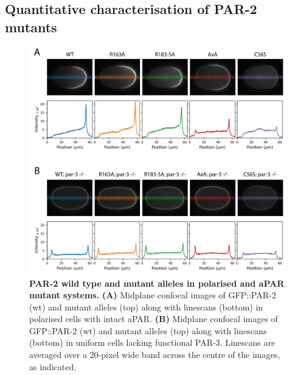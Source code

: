 \documentclass[12pt]{"article"}
\newcommand{\mycaption}[2]{\caption[#1]{\textbf{#1.} #2}}
\begin{document}
\clearpage
\subsection{Quantitative characterisation of PAR-2 mutants}

\begin{figure}
\includegraphics[scale=0.95]{par2_misc_mutants}
\centering
\mycaption{PAR-2 wild type and mutant alleles in polarised and aPAR mutant systems}{
\textbf{(A)} Midplane confocal images of GFP::PAR-2 (wt) and mutant alleles (top) along with linescans (bottom) in polarised cells with intact aPAR.
\textbf{(B)} Midplane confocal images of GFP::PAR-2 (wt) and mutant alleles (top) along with linescans (bottom) in uniform cells lacking functional PAR-3. Linescans are averaged over a 20-pixel wide band across the centre of the images, as indicated.
}
\label{fig:par2_misc_mutants}
\end{figure}
\end{document}
